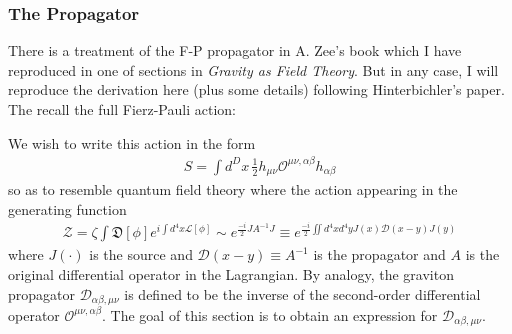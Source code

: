 \documentclass{book}
\theoremstyle{definition}
\newcommand*\widefbox[1]{\fbox{\hspace{2em}#1\hspace{2em}}}
\newcommand{\p}{\partial}
\newcommand{\lag}{\mathcal{L}}
\newcommand{\nn}{\nonumber}
\newcommand{\f}[2]{\frac{#1}{#2}}
\newcommand{\lp}{\left(}
\newcommand{\rp}{\right)}
\newcommand{\D}{\mathcal{D}}
\newcommand{\Z}{\mathcal{Z}}
\begin{document}
\subsubsection{The Propagator}

There is a treatment of the F-P propagator in A. Zee's book which I have reproduced in one of sections in \textit{Gravity as Field Theory}. But in any case, I will reproduce the derivation here (plus some details) following Hinterbichler's paper. \\

The recall the full Fierz-Pauli action:
We wish to write this action in the form
\begin{align}
S = \int d^Dx\,\f{1}{2}h_{\mu\nu}\mathcal{O}^{\mu\nu,\alpha\beta}h_{\alpha\beta}
\end{align}
so as to resemble quantum field theory where the action appearing in the generating function 
\begin{align}
\Z = \zeta \int \mathfrak{D}[\phi] e^{i\int d^4x \lag[\phi]}\sim e^{\f{-i}{2}JA^{-1}J} \equiv e^{\f{-i}{2}\iint d^4xd^4y J(x)\D(x-y)J(y)}
\end{align}
where $J(\cdot)$ is the source and $\D(x-y) \equiv A^{-1}$ is the propagator and $A$ is the original differential operator in the Lagrangian. By analogy, the graviton propagator $\D_{\alpha\beta,\mu\nu}$ is defined to be the inverse of the second-order differential operator $\mathcal{O}^{\mu\nu,\alpha\beta}$. The goal of this section is to obtain an expression for $\D_{\alpha\beta,\mu\nu}$.\\
\end{document}
